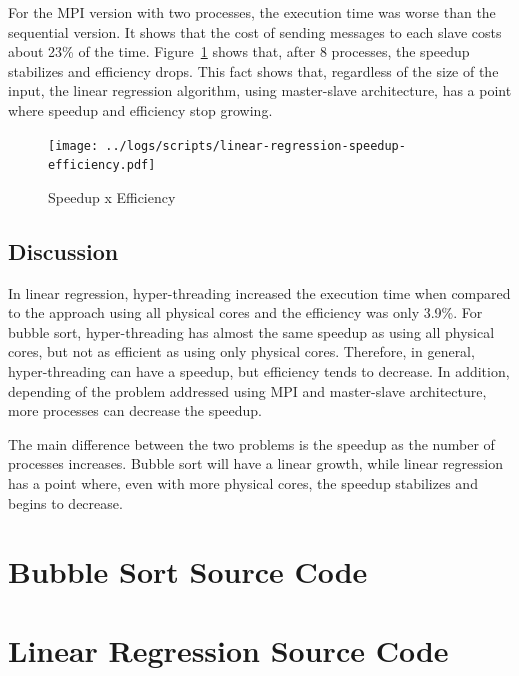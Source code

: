 \documentclass[10pt, twocolumn]{report}
\begin{document}
For the MPI version with two processes, the execution time was worse than the sequential version. It shows that the cost of sending messages to each slave costs about 23\% of the time. Figure~\ref{fig:linear-regression-speedup-efficiency} shows that, after 8 processes, the speedup stabilizes and efficiency drops. This fact shows that, regardless of the size of the input, the linear regression algorithm, using master-slave architecture, has a point where speedup and efficiency stop growing.

\begin{figure}[ht]
	\centering
	\texttt{[image: ../logs/scripts/linear-regression-speedup-efficiency.pdf]}
	\caption{Speedup x Efficiency}
	\label{fig:linear-regression-speedup-efficiency}
\end{figure}

\section{Discussion}
In linear regression, hyper-threading increased the execution time when compared to the approach using all physical cores and the efficiency was only 3.9\%. For bubble sort, hyper-threading has almost the same speedup as using all physical cores, but not as efficient as using only physical cores. Therefore, in general, hyper-threading can have a speedup, but efficiency tends to decrease. In addition, depending of the problem addressed using MPI and master-slave architecture, more processes can decrease the speedup.

The main difference between the two problems is the speedup as the number of processes increases. Bubble sort will have a linear growth, while linear regression has a point where, even with more physical cores, the speedup stabilizes and begins to decrease.

\begin{appendices}
	\chapter{Bubble Sort Source Code}
	
	
	

	\chapter{Linear Regression Source Code}
	
	
	
\end{appendices}
\end{document}
